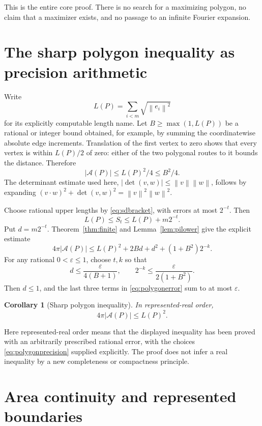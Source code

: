 \documentclass[11pt,a4paper]{article}
\newtheorem{corollary}[theorem]{Corollary}
\theoremstyle{definition}
\newcommand{\eps}{\varepsilon}
\newcommand{\norm}[1]{\left\|#1\right\|}
\newcommand{\Area}{\mathcal A}
\begin{document}
This is the entire core proof. There is no search for a maximizing
polygon, no claim that a maximizer exists, and no passage to an
infinite Fourier expansion.

\section{The sharp polygon inequality as precision arithmetic}
\label{sec:polygonlimit}
Write
\[
 L(P)=\sum_{i<m}\sqrt{\norm{e_i}^2}
\]
for its explicitly computable length name. Let
\(B\ge\max(1,L(P))\) be a rational or integer bound obtained, for
example, by summing the coordinatewise absolute edge increments.
Translation of the first vertex to zero shows that every vertex is
within \(L(P)/2\) of zero: either of the two polygonal routes to
it bounds the distance. Therefore
\[
 |\Area(P)|\le L(P)^2/4\le B^2/4.
 \tag{7.1}\label{eq:crudear}
\]
The determinant estimate used here,
\(|\det(v,w)|\le\norm v\norm w\), follows by expanding
\((v\cdot w)^2+\det(v,w)^2=\norm v^2\norm w^2\).

Choose rational upper lengths by \eqref{eq:sdbracket}, with errors
at most \(2^{-t}\). Then
\[
 L(P)\le S_t\le L(P)+m2^{-t}.
\]
Put \(d=m2^{-t}\). Theorem~\ref{thm:finite} and
Lemma~\ref{lem:pilower} give the explicit estimate
\[
 4\pi|\Area(P)|
 \le L(P)^2+2Bd+d^2+(1+B^2)2^{-k}.
 \tag{7.2}\label{eq:polygonerror}
\]
For any rational \(0<\eps\le1\), choose \(t,k\) so that
\[
 d\le\frac{\eps}{4(B+1)},\qquad
 2^{-k}\le\frac{\eps}{2(1+B^2)}.
 \tag{7.3}\label{eq:polygonprecision}
\]
Then \(d\le1\), and the last three terms in
\eqref{eq:polygonerror} sum to at most \(\eps\).

\begin{corollary}[Sharp polygon inequality]\label{cor:polygon}
In represented-real order,
\[
 4\pi|\Area(P)|\le L(P)^2.
 \tag{7.4}\label{eq:polygonsharp}
\]
\end{corollary}
Here represented-real order means that the displayed inequality
has been proved with an arbitrarily prescribed rational error, with
the choices \eqref{eq:polygonprecision} supplied explicitly.
The proof does not infer a real inequality by a new completeness
or compactness principle.

\section{Area continuity and represented boundaries}\label{sec:curves}
\end{document}
